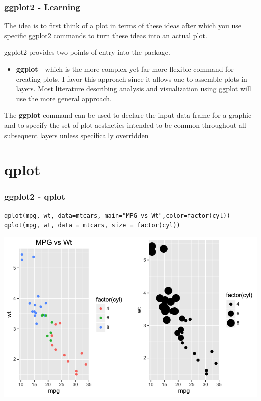 \documentclass{beamer}
\begin{document}

\begin{frame}[fragile]
\frametitle{ggplot2 - Learning}
The idea is to first think of a plot in terms of these ideas after which you use specific ggplot2 commands to turn these ideas into an actual plot. 

ggplot2 provides two points of entry into the package.

\begin{itemize}

\item \textbf{ggplot} - which is the more complex yet far more flexible command for creating plots. I favor this approach since it allows one to assemble plots in layers. Most literature describing analysis and visualization using ggplot will use the more general approach.

\end{itemize}

The \textbf{ggplot} command can be used to declare the input data frame for a graphic and to specify the set of plot aesthetics intended to be common throughout all subsequent layers unless specifically overridden
\end{frame}


\section{qplot}
\begin{frame}[fragile]
\frametitle{ggplot2 - qplot}
\scriptsize
\begin{verbatim}
qplot(mpg, wt, data=mtcars, main="MPG vs Wt",color=factor(cyl))
qplot(mpg, wt, data = mtcars, size = factor(cyl))
\end{verbatim}
\begin{center}
\includegraphics{../IMG/ggplot2_1.png}
\end{center}
\end{frame}
\end{document}
